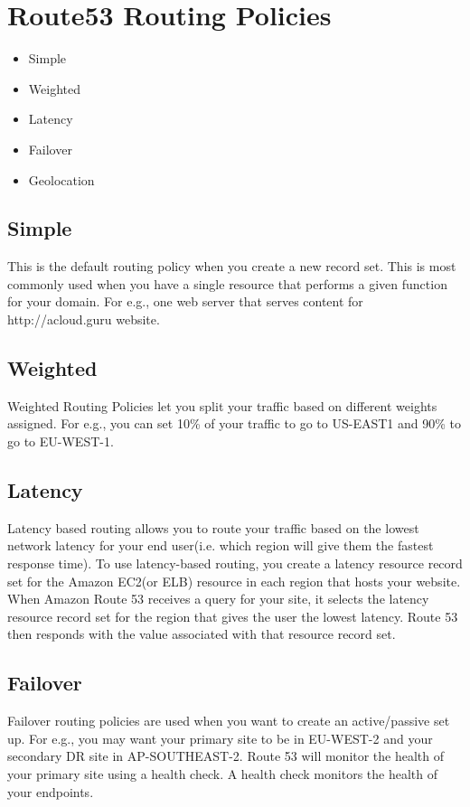 \documentclass{article}
\begin{document}
\section{Route53 Routing Policies}
\begin{itemize}
\item
Simple

\item
Weighted

\item
Latency

\item
Failover

\item
Geolocation

\end{itemize}

\subsection{Simple}
This is the default routing policy when you create a new record set. This is most commonly used when you have a single resource that performs a given function for your domain. For e.g., one web server that serves content for http://acloud.guru website.

\subsection{Weighted}
Weighted Routing Policies let you split your traffic based on different weights assigned. For e.g., you can set 10\% of your traffic to go to US-EAST1 and 90\% to go to EU-WEST-1.

\subsection{Latency}
Latency based routing allows you to route your traffic based on the lowest network latency for your end user(i.e. which region will give them the fastest response time). To use latency-based routing, you create a latency resource record set for the Amazon EC2(or ELB) resource in each region that hosts your website. When Amazon Route 53 receives a query for your site, it selects the latency resource record set for the region that gives the user the lowest latency. Route 53 then responds with the value associated with that resource record set.

\subsection{Failover}
Failover routing policies are used when you want to create an active/passive set up. For e.g., you may want your primary site to be in EU-WEST-2 and your secondary DR site in AP-SOUTHEAST-2. Route 53 will monitor the health of your primary site using a health check. A health check monitors the health of your endpoints.
\end{document}
